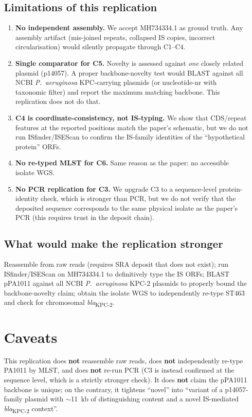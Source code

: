 \documentclass[11pt]{article}
\begin{document}
\subsection{Limitations of this replication}
\begin{enumerate}[leftmargin=1.4em]
  \item \textbf{No independent assembly.} We accept MH734334.1 as ground truth. Any assembly artifact (mis-joined repeats, collapsed IS copies, incorrect circularisation) would silently propagate through C1--C4.
  \item \textbf{Single comparator for C5.} Novelty is assessed against \emph{one} closely related plasmid (p14057). A proper backbone-novelty test would BLAST against all NCBI \textit{P.~aeruginosa} KPC-carrying plasmids (or nucleotide-nr with taxonomic filter) and report the maximum matching backbone. This replication does not do that.
  \item \textbf{C4 is coordinate-consistency, not IS-typing.} We show that CDS/repeat features at the reported positions match the paper's schematic, but we do not run ISfinder/ISEScan to confirm the IS-family identities of the ``hypothetical protein'' ORFs.
  \item \textbf{No re-typed MLST for C6.} Same reason as the paper: no accessible isolate WGS.
  \item \textbf{No PCR replication for C3.} We upgrade C3 to a sequence-level protein-identity check, which is stronger than PCR, but we do not verify that the deposited sequence corresponds to the same physical isolate as the paper's PCR (this requires trust in the deposit chain).
\end{enumerate}

\subsection{What would make the replication stronger}
Reassemble from raw reads (requires SRA deposit that does not exist); run ISfinder/ISEScan on MH734334.1 to definitively type the IS ORFs; BLAST pPA1011 against all NCBI \textit{P.~aeruginosa} KPC-2 plasmids to properly bound the backbone-novelty claim; obtain the isolate WGS to independently re-type ST463 and check for chromosomal \textit{bla}\textsubscript{KPC-2}.

\section{Caveats}
This replication does \textbf{not} reassemble raw reads, does \textbf{not} independently re-type PA1011 by MLST, and does \textbf{not} re-run PCR (C3 is instead confirmed at the sequence level, which is a strictly stronger check). It does \textbf{not} claim the pPA1011 backbone is unique; on the contrary, it tightens ``novel'' into ``variant of a p14057-family plasmid with $\sim$11~kb of distinguishing content and a novel IS-mediated \textit{bla}\textsubscript{KPC-2} context''.
\end{document}
